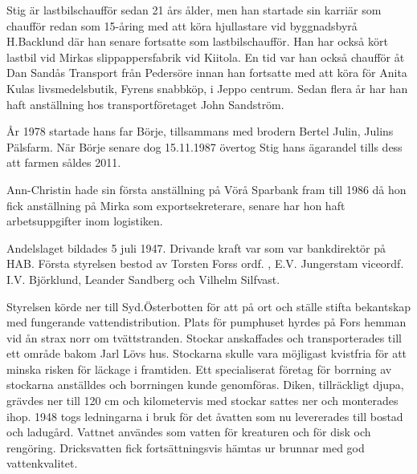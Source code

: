 Stig är lastbilschaufför sedan 21 års ålder, men han startade sin karriär som chaufför redan som 15-åring med att köra hjullastare vid byggnadsbyrå H.Backlund där han senare fortsatte som lastbilschaufför. Han har också kört lastbil vid Mirkas slippappersfabrik vid Kiitola. En tid var han också chaufför åt Dan Sandås Transport från Pedersöre innan han fortsatte med att köra för Anita Kulas livsmedelsbutik, Fyrens
snabbköp, i Jeppo centrum. Sedan flera år har han haft anställning hos transportföretaget John Sandström.

År 1978 startade hans far Börje, tillsammans med brodern Bertel Julin, Julins Pälsfarm. När Börje senare dog 15.11.1987 övertog Stig hans ägarandel tills dess att farmen såldes 2011.

Ann-Christin hade sin första anställning på Vörå Sparbank fram till 1986 då hon fick anställning på Mirka som exportsekreterare, senare har hon haft arbetsuppgifter inom logistiken.
\begin{jhchildren}
  \item {}
  \item {}
\end{jhchildren}


%

\jhnooccupant{}


Andelslaget bildades 5 juli 1947. Drivande kraft var  som var bankdirektör på HAB. Första styrelsen bestod av Torsten Forss ordf. , E.V. Jungerstam viceordf. I.V. Björklund, Leander Sandberg och Vilhelm Silfvast.



Styrelsen körde ner till Syd.Österbotten för att på ort och ställe stifta bekantskap med fungerande vattendistribution. Plats för pumphuset hyrdes på Fors hemman vid ån strax norr om tvättstranden. Stockar anskaffades och transporterades till ett område bakom Jarl Lövs hus. Stockarna skulle vara möjligast kvistfria för att minska risken för läckage i framtiden. Ett specialiserat företag för borrning av stockarna
anställdes och borrningen kunde genomföras. Diken, tillräckligt djupa, grävdes ner till 120 cm och kilometervis med stockar sattes ner och monterades ihop. 1948 togs ledningarna i bruk för det åvatten som nu levererades till bostad och ladugård. Vattnet användes som  vatten för kreaturen och för disk och rengöring. Dricksvatten fick fortsättningsvis hämtas ur brunnar med god vattenkvalitet.

